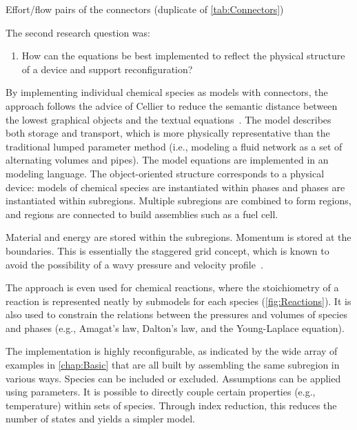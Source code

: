 \begin{sidewaystable}[hbtp]
  \caption{Effort\slash{}flow pairs of the connectors (duplicate of \autoref{tab:Connectors})}
  \label{tab:Connectors2}
  
\end{sidewaystable}


The second research question was:
\begin{enumerate}[\bfseries RQ2:]
  \item How can the equations be best implemented to reflect the physical structure of a device and support reconfiguration?
\end{enumerate}
By implementing individual chemical species as models with connectors, the approach follows the advice of Cellier to reduce the semantic distance between the lowest graphical objects and the textual equations~\cite{Cellier2009}.  The  model describes both storage and transport, which is more physically representative than the traditional lumped parameter method (i.e., modeling a fluid network as a set of alternating volumes and pipes).  The model equations are implemented in an  modeling language.  The object-oriented structure corresponds to a physical device:  models of chemical species are instantiated within phases and phases are instantiated within subregions.  Multiple subregions are combined to form regions, and regions are connected to build assemblies such as a fuel cell.  

Material and energy are stored within the subregions.  Momentum is stored at the boundaries.  This is essentially the staggered grid concept, which is known to avoid the possibility of a wavy pressure and velocity profile~\cite{Patankar1980}.  %

The  approach is even used for chemical reactions, where the stoichiometry of a reaction is represented neatly by submodels for each species (\autoref{fig:Reactions}).  It is also used to constrain the relations between the pressures and volumes of species and phases (e.g., Amagat's law, Dalton's law, and the Young-Laplace equation).

The implementation is highly reconfigurable, as indicated by the wide array of examples in \autoref{chap:Basic} that are all built by assembling the same subregion in various ways.  Species can be included or excluded.  Assumptions can be applied using parameters.  It is possible to directly couple certain properties (e.g., temperature) within sets of species.  Through index reduction, this reduces the number of states and yields a simpler model.  

